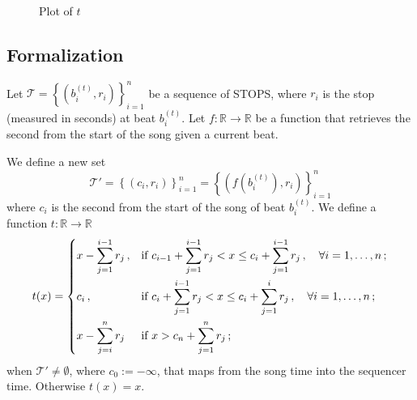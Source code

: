 \documentclass[a4paper,9pt]{article}
\begin{document}
\begin{figure}[htpb]
	\centering



	\caption{Plot of $t$}
	\label{fig:songtime2seqtime}
\end{figure}

\subsection{Formalization}


Let $ \mathcal{T} =  \left\{\left( b_i^{(t)}, r_i \right)\right\}_{i=1}^{n} $ be a sequence of STOPS, where $ r_i $ is the stop (measured in seconds) at beat $ b_i^{(t)} $. Let $ f:\mathbb{R}\rightarrow \mathbb{R} $ be a function that retrieves the second from the start of the song given a current beat.

We define a new set 
\begin{equation}
	\mathcal{T'} = \left\{\left( c_i, r_i \right)\right\}_{i=1}^{n} = \left\{\left( f\left( b_i^{(t)}\right), r_i \right)\right\}_{i=1}^{n}
	\label{eq:tprimeset}
\end{equation}
where $ c_i $ is the second from the start of the song of beat $ b_i^{(t)} $.
We define a function $ t: \mathbb{R}\rightarrow \mathbb{R} $
\begin{equation}
	t(x) = \begin{dcases}
		x - \sum_{j=1}^{i-1}r_j\,, & \text{if $ c_{i-1} + \sum_{j=1}^{i-1}r_j < x \leq c_i + \sum_{j=1}^{i-1}r_j\,, \quad \forall i=1,\dots,n$}\,;\\
		c_i\,, & \text{if $ c_i + \sum_{j=1}^{i-1}r_j < x \leq c_i + \sum_{j=1}^i r_j\,,\quad \forall i=1,\dots,n $}\,;\\
		x - \sum_{j=i}^n r_j & \text{if $ x > c_n + \sum_{j=1}^n r_j $}\,; 
	\end{dcases}
	\label{eq:t}
\end{equation}
when $ \mathcal{T'} \neq \emptyset $, where $ c_0 := -\infty $,  that maps from the song time into the sequencer time. Otherwise $ t(x) = x $.
\end{document}
